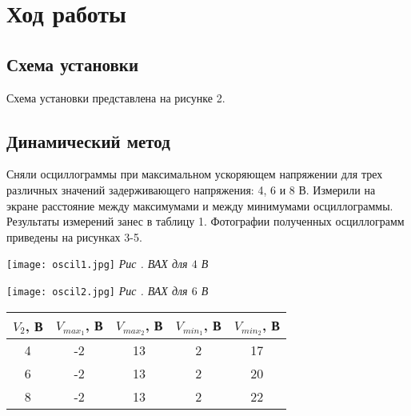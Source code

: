 

\section{Ход работы}

\subsection{Схема установки}

Схема установки представлена на рисунке 2.


\newpage

\subsection{Динамический метод}

Сняли осциллограммы при максимальном ускоряющем напряжении для трех различных значений
задерживающего напряжения: 4, 6 и 8 В. Измерили на экране расстояние между максимумами
и между минимумами осциллограммы. Результаты измерений занес в таблицу 1. Фотографии
полученных осциллограмм приведены на рисунках 3-5. \\

{
    \begin{center}
        \texttt{[image: oscil1.jpg]}
        \textit{Рис . ВАХ для $ 4 $ В}
    \end{center}

} 
{
    \begin{center}
        \texttt{[image: oscil2.jpg]}
        \textit{Рис . ВАХ для $ 6 $ В}
    \end{center}

}

\begin{table}[h!]
    \begin{center}
        \begin{tabular}{|c|c|c|c|c|}
        \hline
        $ V_2 $, В & $ V_{max_1} $, В & $ V_{max_2} $, В & $ V_{min_1} $, В & $ V_{min_2} $, В  \\ \hline
        4 & -2 & 13 & 2 & 17 \\ \hline
        6 & -2 & 13 & 2 & 20 \\ \hline
        8 & -2 & 13 & 2 & 22 \\ \hline
        \end{tabular}
    \end{center}
\end{table}


